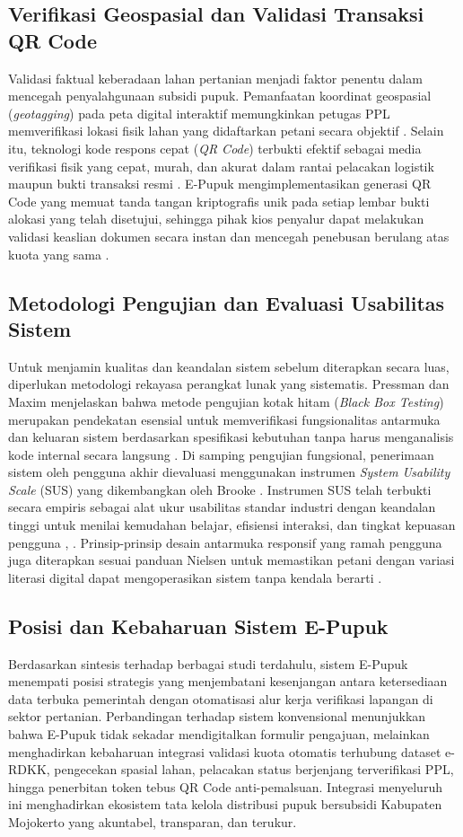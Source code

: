\documentclass[conference]{IEEEtran}
\begin{document}
\subsection{Verifikasi Geospasial dan Validasi Transaksi QR Code}
Validasi faktual keberadaan lahan pertanian menjadi faktor penentu dalam mencegah penyalahgunaan subsidi pupuk. Pemanfaatan koordinat geospasial (\textit{geotagging}) pada peta digital interaktif memungkinkan petugas PPL memverifikasi lokasi fisik lahan yang didaftarkan petani secara objektif \cite{b7}. Selain itu, teknologi kode respons cepat (\textit{QR Code}) terbukti efektif sebagai media verifikasi fisik yang cepat, murah, dan akurat dalam rantai pelacakan logistik maupun bukti transaksi resmi \cite{b12}. E-Pupuk mengimplementasikan generasi QR Code yang memuat tanda tangan kriptografis unik pada setiap lembar bukti alokasi yang telah disetujui, sehingga pihak kios penyalur dapat melakukan validasi keaslian dokumen secara instan dan mencegah penebusan berulang atas kuota yang sama \cite{b12}.

\subsection{Metodologi Pengujian dan Evaluasi Usabilitas Sistem}
Untuk menjamin kualitas dan keandalan sistem sebelum diterapkan secara luas, diperlukan metodologi rekayasa perangkat lunak yang sistematis. Pressman dan Maxim menjelaskan bahwa metode pengujian kotak hitam (\textit{Black Box Testing}) merupakan pendekatan esensial untuk memverifikasi fungsionalitas antarmuka dan keluaran sistem berdasarkan spesifikasi kebutuhan tanpa harus menganalisis kode internal secara langsung \cite{b13}. Di samping pengujian fungsional, penerimaan sistem oleh pengguna akhir dievaluasi menggunakan instrumen \textit{System Usability Scale} (SUS) yang dikembangkan oleh Brooke \cite{b14}. Instrumen SUS telah terbukti secara empiris sebagai alat ukur usabilitas standar industri dengan keandalan tinggi untuk menilai kemudahan belajar, efisiensi interaksi, dan tingkat kepuasan pengguna \cite{b14}, \cite{b16}. Prinsip-prinsip desain antarmuka responsif yang ramah pengguna juga diterapkan sesuai panduan Nielsen untuk memastikan petani dengan variasi literasi digital dapat mengoperasikan sistem tanpa kendala berarti \cite{b15}.

\subsection{Posisi dan Kebaharuan Sistem E-Pupuk}
Berdasarkan sintesis terhadap berbagai studi terdahulu, sistem E-Pupuk menempati posisi strategis yang menjembatani kesenjangan antara ketersediaan data terbuka pemerintah dengan otomatisasi alur kerja verifikasi lapangan di sektor pertanian. Perbandingan terhadap sistem konvensional menunjukkan bahwa E-Pupuk tidak sekadar mendigitalkan formulir pengajuan, melainkan menghadirkan kebaharuan integrasi validasi kuota otomatis terhubung dataset e-RDKK, pengecekan spasial lahan, pelacakan status berjenjang terverifikasi PPL, hingga penerbitan token tebus QR Code anti-pemalsuan. Integrasi menyeluruh ini menghadirkan ekosistem tata kelola distribusi pupuk bersubsidi Kabupaten Mojokerto yang akuntabel, transparan, dan terukur.
\end{document}
